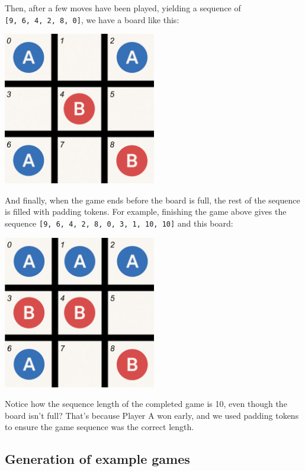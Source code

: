 \documentclass[11pt]{article}
\begin{document}
Then, after a few moves have been played, yielding a sequence of
\texttt{{[}9,\ 6,\ 4,\ 2,\ 8,\ 0{]}}, we have a board like this:

\begin{center}
\includegraphics[width=0.5\textwidth,keepaspectratio]{inserted_images/half_game.png}
\end{center}

And finally, when the game ends before the board is full, the rest of
the sequence is filled with padding tokens. For example, finishing the
game above gives the sequence
\texttt{{[}9,\ 6,\ 4,\ 2,\ 8,\ 0,\ 3,\ 1,\ 10,\ 10{]}} and this board:

\begin{center}
\includegraphics[width=0.5\textwidth,keepaspectratio]{inserted_images/finished_game.png}
\end{center}

Notice how the sequence length of the completed game is 10, even though
the board isn't full? That's because Player A won early, and we used
padding tokens to ensure the game sequence was the correct length.

    \subsection{Generation of example
games}\label{generation-of-example-games}
\end{document}
